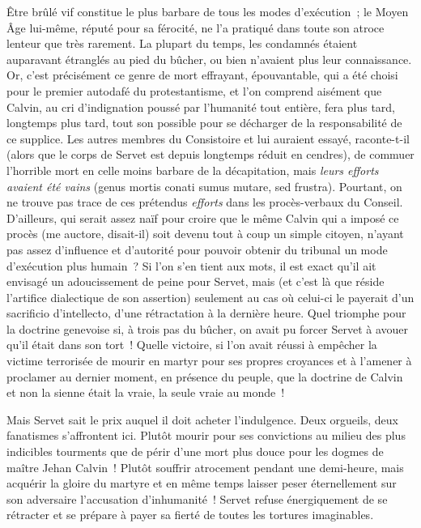 \documentclass[french,twoside]{book} %
\newcommand{\astermono}{\medskip\centerline{\color{rubric}\large\selectfont{\syms ✻}}\medskip\par}%
\begin{document}
\astermono

\noindent Être brûlé vif constitue le plus barbare de tous les modes d’exécution ; le Moyen Âge lui-même, réputé pour sa férocité, ne l’a pratiqué dans toute son atroce lenteur que très rarement. La plupart du temps, les condamnés étaient auparavant étranglés au pied du bûcher, ou bien n’avaient plus leur connaissance. Or, c’est précisément ce genre de mort effrayant, épouvantable, qui a été choisi pour le premier autodafé du protestantisme, et l’on comprend aisément que Calvin, au cri d’indignation poussé par l’humanité tout entière, fera plus tard, longtemps plus tard, tout son possible pour se décharger de la responsabilité de ce supplice. Les autres membres du Consistoire et lui auraient essayé, raconte-t-il (alors que le corps de Servet est depuis longtemps réduit en cendres), de commuer l’horrible mort en celle moins barbare de la décapitation, mais \emph{leurs efforts avaient été vains} (genus mortis conati sumus mutare, sed frustra). Pourtant, on ne trouve pas trace de ces prétendus \emph{efforts} dans les procès-verbaux du Conseil. D’ailleurs, qui serait assez naïf pour croire que le même Calvin qui a imposé ce procès (me auctore, disait-il) soit devenu tout à coup un simple citoyen, n’ayant pas assez d’influence et d’autorité pour pouvoir obtenir du tribunal un mode d’exécution plus humain ? Si l’on s’en tient aux mots, il est exact qu’il ait envisagé un adoucissement de peine pour Servet, mais (et c’est là que réside l’artifice dialectique de son assertion) seulement au cas où celui-ci le payerait d’un sacrificio d’intellecto, d’une rétractation à la dernière heure. Quel triomphe pour la doctrine genevoise si, à trois pas du bûcher, on avait pu forcer Servet à avouer qu’il était dans son tort ! Quelle victoire, si l’on avait réussi à empêcher la victime terrorisée de mourir en martyr pour ses propres croyances et à l’amener à proclamer au dernier moment, en présence du peuple, que la doctrine de Calvin et non la sienne était la vraie, la seule vraie au monde !\par
Mais Servet sait le prix auquel il doit acheter l’indulgence. Deux orgueils, deux fanatismes s’affrontent ici. Plutôt mourir pour ses convictions au milieu des plus indicibles tourments que de périr d’une mort plus douce pour les dogmes de maître Jehan Calvin ! Plutôt souffrir atrocement pendant une demi-heure, mais acquérir la gloire du martyre et en même temps laisser peser éternellement sur son adversaire l’accusation d’inhumanité ! Servet refuse énergiquement de se rétracter et se prépare à payer sa fierté de toutes les tortures imaginables.\par
\end{document}
